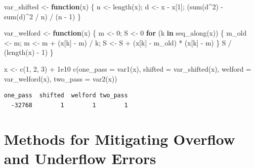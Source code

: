 \documentclass[
  letterpaper,
  DIV=11,
  numbers=noendperiod]{scrreprt}
\newenvironment{Shaded}{\begin{snugshade}}{\end{snugshade}}
\newcommand{\AttributeTok}[1]{\textcolor[rgb]{0.40,0.45,0.13}{#1}}
\newcommand{\ControlFlowTok}[1]{\textcolor[rgb]{0.00,0.23,0.31}{\textbf{#1}}}
\newcommand{\DecValTok}[1]{\textcolor[rgb]{0.68,0.00,0.00}{#1}}
\newcommand{\FloatTok}[1]{\textcolor[rgb]{0.68,0.00,0.00}{#1}}
\newcommand{\FunctionTok}[1]{\textcolor[rgb]{0.28,0.35,0.67}{#1}}
\newcommand{\NormalTok}[1]{\textcolor[rgb]{0.00,0.23,0.31}{#1}}
\newcommand{\OtherTok}[1]{\textcolor[rgb]{0.00,0.23,0.31}{#1}}
\newcommand{\SpecialCharTok}[1]{\textcolor[rgb]{0.37,0.37,0.37}{#1}}
\begin{document}
\begin{Shaded}
\begin{Highlighting}[]
\NormalTok{var\_shifted }\OtherTok{\textless{}{-}} \ControlFlowTok{function}\NormalTok{(x) \{ n }\OtherTok{\textless{}{-}} \FunctionTok{length}\NormalTok{(x); d }\OtherTok{\textless{}{-}}\NormalTok{ x }\SpecialCharTok{{-}}\NormalTok{ x[}\DecValTok{1}\NormalTok{]; (}\FunctionTok{sum}\NormalTok{(d}\SpecialCharTok{\^{}}\DecValTok{2}\NormalTok{) }\SpecialCharTok{{-}} \FunctionTok{sum}\NormalTok{(d)}\SpecialCharTok{\^{}}\DecValTok{2} \SpecialCharTok{/}\NormalTok{ n) }\SpecialCharTok{/}\NormalTok{ (n }\SpecialCharTok{{-}} \DecValTok{1}\NormalTok{) \}}

\NormalTok{var\_welford }\OtherTok{\textless{}{-}} \ControlFlowTok{function}\NormalTok{(x) \{}
\NormalTok{  m }\OtherTok{\textless{}{-}} \DecValTok{0}\NormalTok{; S }\OtherTok{\textless{}{-}} \DecValTok{0}
  \ControlFlowTok{for}\NormalTok{ (k }\ControlFlowTok{in} \FunctionTok{seq\_along}\NormalTok{(x)) \{ m\_old }\OtherTok{\textless{}{-}}\NormalTok{ m; m }\OtherTok{\textless{}{-}}\NormalTok{ m }\SpecialCharTok{+}\NormalTok{ (x[k] }\SpecialCharTok{{-}}\NormalTok{ m) }\SpecialCharTok{/}\NormalTok{ k; S }\OtherTok{\textless{}{-}}\NormalTok{ S }\SpecialCharTok{+}\NormalTok{ (x[k] }\SpecialCharTok{{-}}\NormalTok{ m\_old) }\SpecialCharTok{*}\NormalTok{ (x[k] }\SpecialCharTok{{-}}\NormalTok{ m) \}}
\NormalTok{  S }\SpecialCharTok{/}\NormalTok{ (}\FunctionTok{length}\NormalTok{(x) }\SpecialCharTok{{-}} \DecValTok{1}\NormalTok{) \}}

\NormalTok{x }\OtherTok{\textless{}{-}} \FunctionTok{c}\NormalTok{(}\DecValTok{1}\NormalTok{, }\DecValTok{2}\NormalTok{, }\DecValTok{3}\NormalTok{) }\SpecialCharTok{+} \FloatTok{1e10}
\FunctionTok{c}\NormalTok{(}\AttributeTok{one\_pass =} \FunctionTok{var1}\NormalTok{(x), }\AttributeTok{shifted =} \FunctionTok{var\_shifted}\NormalTok{(x), }\AttributeTok{welford =} \FunctionTok{var\_welford}\NormalTok{(x), }\AttributeTok{two\_pass =} \FunctionTok{var2}\NormalTok{(x))}
\end{Highlighting}
\end{Shaded}

\begin{verbatim}
one_pass  shifted  welford two_pass 
  -32768        1        1        1 
\end{verbatim}

\section{Methods for Mitigating Overflow and Underflow
Errors}\label{methods-for-mitigating-overflow-and-underflow-errors}
\end{document}
